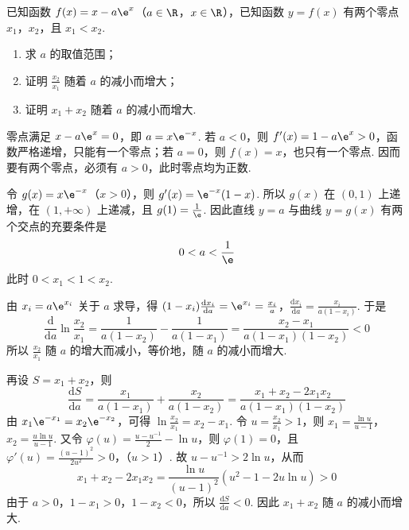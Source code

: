 \begin{problem}
已知函数 \(f(x)=x-a\e^{x}\)（\(a\in\R\)，\(x\in\R\)），已知函数 \(y=f(x)\) 有两个零点 \(x_1\)，\(x_2\)，且 \(x_1<x_2\).

\begin{enumerate}
\item 求 \(a\) 的取值范围；
\item 证明 \(\frac{x_2}{x_1}\) 随着 \(a\) 的减小而增大；
\item 证明 \(x_1+x_2\) 随着 \(a\) 的减小而增大.
\end{enumerate}
\end{problem}

\begin{solution}
零点满足 \(x-a\e^x=0\)，即 \(a=x\e^{-x}\). 若 \(a<0\)，则 \(f'(x)=1-a\e^x>0\)，函数严格递增，只能有一个零点；若 \(a=0\)，则 \(f(x)=x\)，也只有一个零点. 因而要有两个零点，必须有 \(a>0\)，此时零点均为正数.

令 \(g(x)=x\e^{-x}\)（\(x>0\)），则 \(g'(x)=\e^{-x}(1-x)\). 所以 \(g(x)\) 在 \((0,1)\) 上递增，在 \((1,+\infty)\) 上递减，且 \(g(1)=\frac1{\e}\). 因此直线 \(y=a\) 与曲线 \(y=g(x)\) 有两个交点的充要条件是
\[
0<a<\frac1{\e}
\]
此时 \(0<x_1<1<x_2\).

由 \(x_i=a\e^{x_i}\) 关于 \(a\) 求导，得
\((1-x_i)\frac{\mathrm d x_i}{\mathrm d a}=\e^{x_i}=\frac{x_i}{a}\)，\(\frac{\mathrm d x_i}{\mathrm d a}=\frac{x_i}{a(1-x_i)}\).
于是
\[
\frac{\mathrm d}{\mathrm d a}\ln\frac{x_2}{x_1}=\frac{1}{a(1-x_2)}-\frac{1}{a(1-x_1)}=\frac{x_2-x_1}{a(1-x_1)(1-x_2)}<0
\]
所以 \(\frac{x_2}{x_1}\) 随 \(a\) 的增大而减小，等价地，随 \(a\) 的减小而增大.

再设 \(S=x_1+x_2\)，则
\[
\frac{\mathrm d S}{\mathrm d a}=\frac{x_1}{a(1-x_1)}+\frac{x_2}{a(1-x_2)}=\frac{x_1+x_2-2x_1x_2}{a(1-x_1)(1-x_2)}
\]
由 \(x_1\e^{-x_1}=x_2\e^{-x_2}\)，可得 \(\ln\frac{x_2}{x_1}=x_2-x_1\). 令 \(u=\frac{x_2}{x_1}>1\)，则
\(x_1=\frac{\ln u}{u-1}\)，\(x_2=\frac{u\ln u}{u-1}\).
又令 \(\varphi(u)=\frac{u-u^{-1}}{2}-\ln u\)，则 \(\varphi(1)=0\)，且
\(\varphi'(u)=\frac{(u-1)^2}{2u^2}>0\)，（\(u>1\)）.
故 \(u-u^{-1}>2\ln u\)，从而
\[
x_1+x_2-2x_1x_2=\frac{\ln u}{(u-1)^2}\left(u^2-1-2u\ln u\right)>0
\]
由于 \(a>0\)，\(1-x_1>0\)，\(1-x_2<0\)，所以 \(\frac{\mathrm d S}{\mathrm d a}<0\). 因此 \(x_1+x_2\) 随 \(a\) 的减小而增大.
\end{solution}
